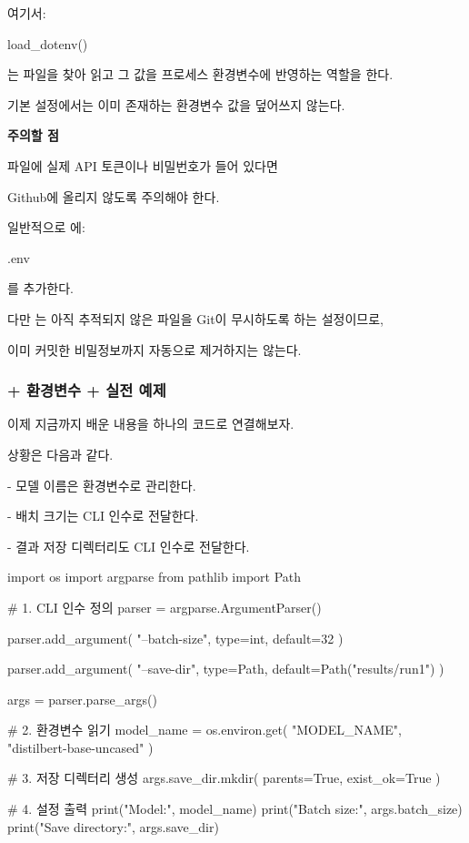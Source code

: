 여기서:

\begin{dhkcode}
load_dotenv()
\end{dhkcode}

는 파일을 찾아 읽고 그 값을 프로세스 환경변수에 반영하는 역할을 한다.

기본 설정에서는 이미 존재하는 환경변수 값을 덮어쓰지 않는다.

\textbf{주의할 점}

파일에 실제 API 토큰이나 비밀번호가 들어 있다면

Github에 올리지 않도록 주의해야 한다.

일반적으로 에:

\begin{dhkcode}
.env
\end{dhkcode}

를 추가한다.

다만 는 아직 추적되지 않은 파일을 Git이 무시하도록 하는 설정이므로,

이미 커밋한 비밀정보까지 자동으로 제거하지는 않는다.

\subsubsection{ + 환경변수 +  실전 예제}

이제 지금까지 배운 내용을 하나의 코드로 연결해보자.

상황은 다음과 같다.

\begin{dhksmry}
    - 모델 이름은 환경변수로 관리한다.

    - 배치 크기는 CLI 인수로 전달한다.

    - 결과 저장 디렉터리도 CLI 인수로 전달한다.
\end{dhksmry}

\begin{dhkcode}
import os
import argparse
from pathlib import Path

# 1. CLI 인수 정의
parser = argparse.ArgumentParser()

parser.add_argument(
    "--batch-size",
    type=int,
    default=32
)

parser.add_argument(
    "--save-dir",
    type=Path,
    default=Path("results/run1")
)

args = parser.parse_args()

# 2. 환경변수 읽기
model_name = os.environ.get(
    "MODEL_NAME",
    "distilbert-base-uncased"
)

# 3. 저장 디렉터리 생성
args.save_dir.mkdir(
    parents=True,
    exist_ok=True
)

# 4. 설정 출력
print("Model:", model_name)
print("Batch size:", args.batch_size)
print("Save directory:", args.save_dir)
\end{dhkcode}

